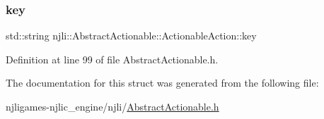 \subsubsection{\texorpdfstring{key}{key}}
{\footnotesize\ttfamily std\+::string njli\+::\+Abstract\+Actionable\+::\+Actionable\+Action\+::key}



Definition at line 99 of file Abstract\+Actionable.\+h.



The documentation for this struct was generated from the following file\+:\begin{DoxyCompactItemize}
\item 
njligames-\/njlic\+\_\+engine/njli/\mbox{\hyperlink{_abstract_actionable_8h}{Abstract\+Actionable.\+h}}\end{DoxyCompactItemize}

